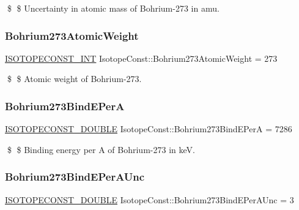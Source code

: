 \$ \$ Uncertainty in atomic mass of Bohrium-\/273 in amu. \mbox{\label{group___isotope_const-_bohrium-_bh273_ga28859630d8dadd8cd270895ba87d6c1b}} 
\subsubsection{\texorpdfstring{Bohrium273\+Atomic\+Weight}{Bohrium273AtomicWeight}}
{\footnotesize\ttfamily \mbox{\hyperlink{group___isotope_const-_macros_ga5f18360b3e99483a35c32d789e62621c}{I\+S\+O\+T\+O\+P\+E\+C\+O\+N\+S\+T\+\_\+\+I\+NT}} Isotope\+Const\+::\+Bohrium273\+Atomic\+Weight = 273}

\$ \$ Atomic weight of Bohrium-\/273. \mbox{\label{group___isotope_const-_bohrium-_bh273_ga7611a6a0d62476c6a11b3ee7db3a0c63}} 
\subsubsection{\texorpdfstring{Bohrium273\+Bind\+E\+PerA}{Bohrium273BindEPerA}}
{\footnotesize\ttfamily \mbox{\hyperlink{group___isotope_const-_macros_ga8f45a7272ce02c0b4c65c44636ed719a}{I\+S\+O\+T\+O\+P\+E\+C\+O\+N\+S\+T\+\_\+\+D\+O\+U\+B\+LE}} Isotope\+Const\+::\+Bohrium273\+Bind\+E\+PerA = 7286}

\$ \$ Binding energy per A of Bohrium-\/273 in keV. \mbox{\label{group___isotope_const-_bohrium-_bh273_gaa55c257a339856430c15f8e1c700dd94}} 
\subsubsection{\texorpdfstring{Bohrium273\+Bind\+E\+Per\+A\+Unc}{Bohrium273BindEPerAUnc}}
{\footnotesize\ttfamily \mbox{\hyperlink{group___isotope_const-_macros_ga8f45a7272ce02c0b4c65c44636ed719a}{I\+S\+O\+T\+O\+P\+E\+C\+O\+N\+S\+T\+\_\+\+D\+O\+U\+B\+LE}} Isotope\+Const\+::\+Bohrium273\+Bind\+E\+Per\+A\+Unc = 3}

